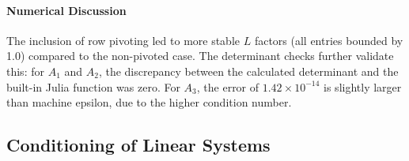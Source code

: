 \begin{solution}
	\paragraph{Numerical Discussion}
	The inclusion of row pivoting led to more stable $L$ factors (all entries
	bounded by 1.0) compared to the non-pivoted case. The determinant checks further
	validate this: for $A_1$ and $A_2$, the discrepancy between the calculated
	determinant and the built-in Julia function was zero. For $A_3$, the error of
	$1.42 \times 10^{-14}$ is slightly larger than machine epsilon, due to the
	higher condition number.

\end{solution}

\subsection{Conditioning of Linear Systems}

